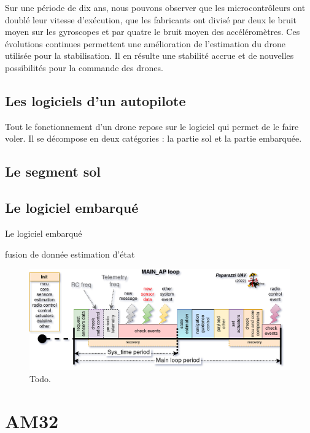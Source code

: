 Sur une période de dix ans, nous pouvons observer que les microcontrôleurs ont doublé leur vitesse d'exécution, que les fabricants ont divisé par deux le bruit moyen sur les gyroscopes et par quatre le bruit moyen des accéléromètres.
Ces évolutions continues permettent une amélioration de l'estimation du drone utilisée pour la stabilisation. Il en résulte une stabilité accrue et de nouvelles possibilités pour la commande des drones.

 \subsection{Les logiciels d'un autopilote}
 \label{sec:logiciel}
 Tout le fonctionnement d'un drone repose sur le logiciel qui permet de le faire voler. Il se décompose en deux catégories : la partie sol et la partie embarquée.

 \subsection{Le segment sol}

 \subsection{Le logiciel embarqué}
 Le logiciel embarqué 

 fusion de donnée 
 estimation d'état 

 \begin{figure}[ht!]
    \centerline{
    \includegraphics[trim=0cm 0cm 0cm 0cm,clip,width=1\columnwidth]{figures/PPRZ_Main_ap_loop.png}}
    \caption{Todo.}
    \label{fig:schedulingpaparazzi}
\end{figure}


\section{AM32}
\label{sec:AM32}
